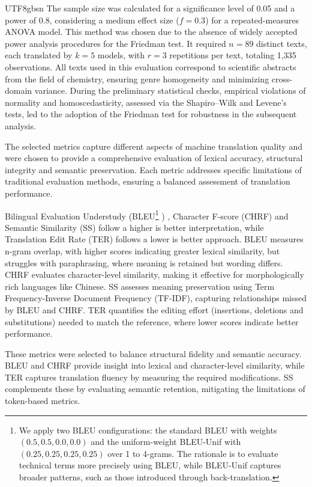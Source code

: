 \documentclass[conference]{IEEEtran}
\begin{document}
\begin{CJK}{UTF8}{gbsn}
The sample size was calculated for a significance level of 0.05 and a power of 0.8, considering a medium effect size (\( f = 0.3 \)) for a repeated-measures ANOVA model. This method was chosen due to the absence of widely accepted power analysis procedures for the Friedman test. It required \( n = 89 \) distinct texts, each translated by \( k = 5 \) models, with \( r = 3 \) repetitions per text, totaling 1,335 observations. All texts used in this evaluation correspond to scientific abstracts from the field of chemistry, ensuring genre homogeneity and minimizing cross-domain variance. During the preliminary statistical checks, empirical violations of normality and homoscedasticity, assessed via the Shapiro–Wilk and Levene’s tests, led to the adoption of the Friedman test for robustness in the subsequent analysis.


The selected metrics capture different aspects of machine translation quality and were chosen to provide a comprehensive evaluation of lexical accuracy, structural integrity and semantic preservation. Each metric addresses specific limitations of traditional evaluation methods, ensuring a balanced assessment of translation performance.

Bilingual Evaluation Understudy (BLEU\footnote{We apply two BLEU configurations: the standard BLEU with weights $(0.5, 0.5, 0.0, 0.0)$ and the uniform-weight BLEU-Unif with $(0.25, 0.25, 0.25, 0.25)$ over 1 to 4-grams. The rationale is to evaluate technical terms more precisely using BLEU, while BLEU-Unif captures broader patterns, such as those introduced through back-translation.}
) \citep{papineni2002bleu}, Character F-score (CHRF) and Semantic Similarity (SS) follow a higher is better interpretation, while Translation Edit Rate (TER) follows a lower is better approach. BLEU measures n-gram overlap, with higher scores indicating greater lexical similarity, but struggles with paraphrasing, where meaning is retained but wording differs. CHRF evaluates character-level similarity, making it effective for morphologically rich languages like Chinese. SS assesses meaning preservation using Term Frequency-Inverse Document Frequency (TF-IDF), capturing relationships missed by BLEU and CHRF. TER quantifies the editing effort (insertions, deletions and substitutions) needed to match the reference, where lower scores indicate better performance.

These metrics were selected to balance structural fidelity and semantic accuracy. BLEU and CHRF provide insight into lexical and character-level similarity, while TER captures translation fluency by measuring the required modifications. SS complements these by evaluating semantic retention, mitigating the limitations of token-based metrics.


\end{CJK}
\end{document}
